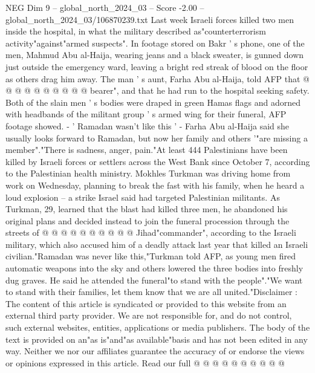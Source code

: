 \begin{textsample}{NEG Dim 9 – global\_north\_2024\_03 – Score -2.00 – global\_north\_2024\_03/106870239.txt}
Last week Israeli forces killed two men inside the hospital, in what the military described as"counterterrorism activity"against"armed suspects".
In footage stored on Bakr ' s phone, one of the men, Mahmud Abu al-Haija, wearing jeans and a black sweater, is gunned down just outside the emergency ward, leaving a bright red streak of blood on the floor as others drag him away.
The man ' s aunt, Farha Abu al-Haija, told AFP that @ @ @ @ @ @ @ @ @ @ bearer", and that he had run to the hospital seeking safety.
Both of the slain men ' s bodies were draped in green Hamas flags and adorned with headbands of the militant group ' s armed wing for their funeral, AFP footage showed. - ' Ramadan wasn't like this ' - Farha Abu al-Haija said she usually looks forward to Ramadan, but now her family and others '"are missing a member"."There is sadness, anger, pain."At least 444 Palestinians have been killed by Israeli forces or settlers across the West Bank since October 7, according to the Palestinian health ministry.
Mokhles Turkman was driving home from work on Wednesday, planning to break the fast with his family, when he heard a loud explosion -- a strike Israel said had targeted Palestinian militants.
As Turkman, 29, learned that the blast had killed three men, he abandoned his original plans and decided instead to join the funeral procession through the streets of @ @ @ @ @ @ @ @ @ @ Jihad"commander", according to the Israeli military, which also accused him of a deadly attack last year that killed an Israeli civilian."Ramadan was never like this,"Turkman told AFP, as young men fired automatic weapons into the sky and others lowered the three bodies into freshly dug graves.
He said he attended the funeral"to stand with the people"."We want to stand with their families, let them know that we are all united."Disclaimer : The content of this article is syndicated or provided to this website from an external third party provider.
We are not responsible for, and do not control, such external websites, entities, applications or media publishers.
The body of the text is provided on an"as is"and"as available"basis and has not been edited in any way.
Neither we nor our affiliates guarantee the accuracy of or endorse the views or opinions expressed in this article.
Read our full @ @ @ @ @ @ @ @ @ @

\end{textsample}
